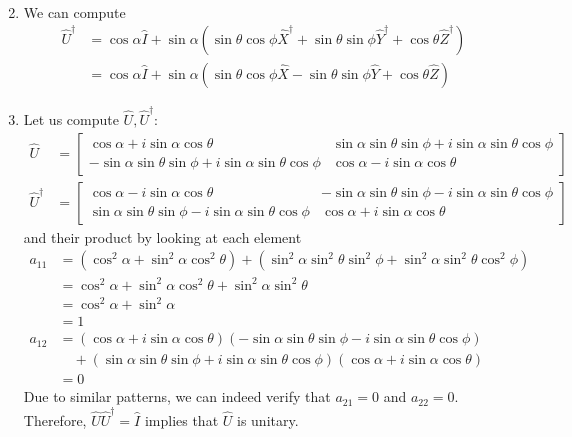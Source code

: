 \documentclass{article}
\numberwithin{equation}{section}
\begin{document}
\begin{enumerate}
\begin{align}
    \end{align} 
    \item We can compute 
    \begin{align}
        \hat{U}^\dagger &= \cos\alpha \hat{I} + \sin\alpha\left(\sin\theta\cos\phi\hat{X}^\dagger + \sin\theta\sin\phi\hat{Y}^\dagger + \cos\theta\hat{Z}^\dagger\right) \\ 
        &= \cos\alpha \hat{I} + \sin\alpha\left(\sin\theta\cos\phi\hat{X} - \sin\theta\sin\phi\hat{Y} + \cos\theta\hat{Z}\right)
    \end{align}
    \item Let us compute $\hat{U},\hat{U}^\dagger$:
    \begin{align}
        \hat{U} &= \begin{bmatrix}
            \cos\alpha + i\sin\alpha\cos\theta & \sin\alpha\sin\theta\sin\phi + i\sin\alpha\sin\theta\cos\phi \\
             - \sin\alpha\sin\theta\sin\phi + i\sin\alpha\sin\theta\cos\phi & \cos\alpha - i\sin\alpha\cos\theta
        \end{bmatrix} \\ 
        \hat{U}^\dagger &= \begin{bmatrix}
            \cos\alpha - i\sin\alpha\cos\theta & - \sin\alpha\sin\theta\sin\phi - i\sin\alpha\sin\theta\cos\phi \\
            \sin\alpha\sin\theta\sin\phi - i\sin\alpha\sin\theta\cos\phi & \cos\alpha + i\sin\alpha\cos\theta
        \end{bmatrix}
    \end{align}
    and their product by looking at each element
    \begin{align*}
        a_{11} &= (\cos^2\alpha+\sin^2\alpha\cos^2\theta) + (\sin^2\alpha\sin^2\theta\sin^2\phi+\sin^2\alpha\sin^2\theta\cos^2\phi) \\ 
        &= \cos^2\alpha+\sin^2\alpha\cos^2\theta + \sin^2\alpha\sin^2\theta \\ 
        &= \cos^2\alpha + \sin^2\alpha \\ 
        &= 1 \\ 
        a_{12} &= (\cos\alpha + i\sin\alpha\cos\theta)(- \sin\alpha\sin\theta\sin\phi - i\sin\alpha\sin\theta\cos\phi) \\ 
        &\quad + (\sin\alpha\sin\theta\sin\phi + i\sin\alpha\sin\theta\cos\phi)(\cos\alpha + i\sin\alpha\cos\theta) \\ 
        &= 0
    \end{align*}
    Due to similar patterns, we can indeed verify that $a_{21}=0$ and $a_{22}=0$. Therefore, $\hat{U}\hat{U}^\dagger = \hat{I}$ implies that $\hat{U}$ is unitary.

\end{enumerate}
\end{document}
